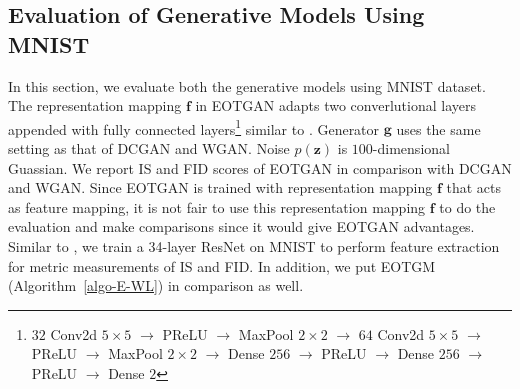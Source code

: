 \subsection{Evaluation of Generative Models Using MNIST}
In this section, we evaluate both the generative models using MNIST dataset.
The representation mapping $\bm{f}$ in EOTGAN adapts two converlutional layers
appended with fully connected layers\footnote{$32$ Conv2d $5 \times5$
  $\rightarrow$ PReLU $\rightarrow$ MaxPool $2\times2$ $\rightarrow$
  $64$ Conv2d $5\times5$ $\rightarrow$ PReLU $\rightarrow$ MaxPool
  $2\times2$ $\rightarrow$ Dense $256$ $\rightarrow$ PReLU
  $\rightarrow$ Dense $256$ $\rightarrow$ PReLU $\rightarrow$ Dense
  $2$}
similar to \cite{1467314}\cite{1640964}. Generator $\bm{g}$ uses the same
setting as that of DCGAN and WGAN. Noise $p(\bm{z})$ is $100$-dimensional Guassian.
We report IS and FID scores of EOTGAN in comparison with DCGAN and WGAN. Since EOTGAN is trained with representation mapping $\bm{f}$ that
acts as feature mapping, it is not fair to use this representation mapping $\bm{f}$ to do the
evaluation and make comparisons since it would give EOTGAN
advantages. Similar to \cite{2018arXiv180607755X}, we train a 34-layer
ResNet on MNIST to perform feature extraction for metric measurements
of IS and FID. In addition, we put EOTGM (Algorithm~\autoref{algo-E-WL}) in comparison as well.

